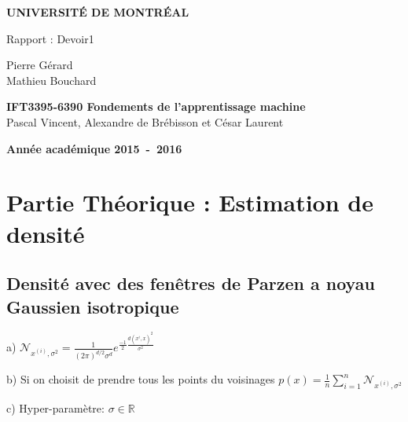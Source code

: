 \documentclass[a4paper,10pt]{article}
\begin{document}
\begin{titlepage}
\begin{center}
\textbf{\textsc{UNIVERSIT\'E DE MONTR\'EAL}}\\
\vfill{}\vfill{}
\begin{center}{\Huge Rapport : Devoir1 }\end{center}{\Huge \par}
\begin{center}{\large Pierre Gérard \\ Mathieu Bouchard}\end{center}{\Huge \par}
\vfill{}\vfill{} \vfill{}
\begin{center}{\large \textbf{IFT3395-6390 Fondements de l'apprentissage machine}}\hfill{\\Pascal Vincent, Alexandre de Brébisson et César Laurent}\end{center}{\large\par}
\vfill{}\vfill{}\enlargethispage{3cm}
\textbf{Année académique 2015~-~2016}
\end{center}
\end{titlepage}



\tableofcontents

\pagebreak

\section{Partie Théorique : Estimation de densité}

\subsection{Densité avec des fenêtres de Parzen a noyau Gaussien isotropique}

a) $\mathcal{N}_{x^{(i)}, \sigma^{2}} = \frac{1}{(2 \pi)^{d/2} \sigma^{d}} e^{ \frac{-1}{2} \frac{d(x^{i},x)^{2}}{\sigma^{2}} } $



b) Si on choisit de prendre tous les points du voisinages
$ p(x) =  \frac{1}{n} \sum_{i=1}^{n} \mathcal{N}_{x^{(i)}, \sigma^{2}} $

c) Hyper-paramètre: $\sigma \in \mathds{R}$
\end{document}
